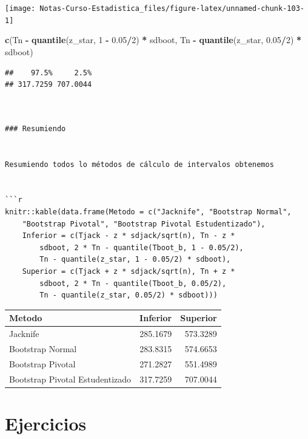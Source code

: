 \documentclass[
  12pt,
]{book}
\newenvironment{Shaded}{\begin{snugshade}}{\end{snugshade}}
\newcommand{\DecValTok}[1]{\textcolor[rgb]{0.00,0.00,0.81}{#1}}
\newcommand{\FloatTok}[1]{\textcolor[rgb]{0.00,0.00,0.81}{#1}}
\newcommand{\KeywordTok}[1]{\textcolor[rgb]{0.13,0.29,0.53}{\textbf{#1}}}
\newcommand{\NormalTok}[1]{#1}
\newcommand{\OperatorTok}[1]{\textcolor[rgb]{0.81,0.36,0.00}{\textbf{#1}}}
\newcommand{\StringTok}[1]{\textcolor[rgb]{0.31,0.60,0.02}{#1}}
\theoremstyle{definition}
\theoremstyle{definition}
\theoremstyle{definition}
\theoremstyle{remark}
\begin{document}
\begin{center}\texttt{[image: Notas-Curso-Estadistica\_files/figure-latex/unnamed-chunk-103-1]} \end{center}

\begin{Shaded}
\begin{Highlighting}[]
\KeywordTok{c}\NormalTok{(Tn }\OperatorTok{-}\StringTok{ }\KeywordTok{quantile}\NormalTok{(z_star, }\DecValTok{1} \OperatorTok{-}\StringTok{ }\FloatTok{0.05}\OperatorTok{/}\DecValTok{2}\NormalTok{) }\OperatorTok{*}\StringTok{ }\NormalTok{sdboot, Tn }\OperatorTok{-}\StringTok{ }
\StringTok{    }\KeywordTok{quantile}\NormalTok{(z_star, }\FloatTok{0.05}\OperatorTok{/}\DecValTok{2}\NormalTok{) }\OperatorTok{*}\StringTok{ }\NormalTok{sdboot)}
\end{Highlighting}
\end{Shaded}

\begin{verbatim}
##    97.5%     2.5% 
## 317.7259 707.0044
\end{verbatim}

\begin{verbatim}


### Resumiendo


Resumiendo todos lo métodos de cálculo de intervalos obtenemos


```r
knitr::kable(data.frame(Metodo = c("Jacknife", "Bootstrap Normal", 
    "Bootstrap Pivotal", "Bootstrap Pivotal Estudentizado"), 
    Inferior = c(Tjack - z * sdjack/sqrt(n), Tn - z * 
        sdboot, 2 * Tn - quantile(Tboot_b, 1 - 0.05/2), 
        Tn - quantile(z_star, 1 - 0.05/2) * sdboot), 
    Superior = c(Tjack + z * sdjack/sqrt(n), Tn + z * 
        sdboot, 2 * Tn - quantile(Tboot_b, 0.05/2), 
        Tn - quantile(z_star, 0.05/2) * sdboot)))
\end{verbatim}

\begin{tabular}{l|r|r}
\hline
Metodo & Inferior & Superior\\
\hline
Jacknife & 285.1679 & 573.3289\\
\hline
Bootstrap Normal & 283.8315 & 574.6653\\
\hline
Bootstrap Pivotal & 271.2827 & 551.4989\\
\hline
Bootstrap Pivotal Estudentizado & 317.7259 & 707.0044\\
\hline
\end{tabular}

\hypertarget{ejercicios-1}{%
\section{Ejercicios}\label{ejercicios-1}}
\end{document}
